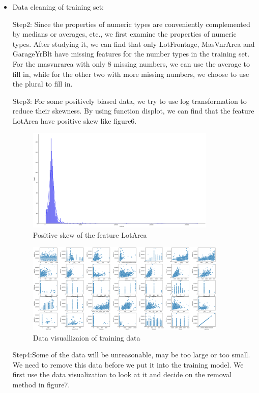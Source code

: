 \documentclass{amsart}
\begin{document}
\begin{itemize}
	\item Data cleaning of training set:\par
	Step2:	Since the properties of numeric types are conveniently complemented by medians or averages, etc., we first examine the properties of numeric types. After studying it, we can find that only LotFrontage, MasVnrArea and GarageYrBlt have missing features for the number types in the training set. For the masvnrarea with only 8 missing numbers, we can use the average to fill in, while for the other two with more missing numbers, we choose to use the plural to fill in.\par
	Step3:	For some positively biased data, we try to use log transformation to reduce their skewness. By using function displot, we can find that the feature LotArea have positive skew like figure6.\par
	\begin{figure}[H]
		\centering
		\includegraphics[width=0.85\textwidth]{../Data/Fig6}
		\caption{Positive skew of the feature LotArea}\label{object}
	\end{figure}
	\begin{figure}[H]
		\centering
		\includegraphics[width=0.9\textwidth]{../Data/Fig7}
		\caption{Data visuallizaion of training data}\label{object}
	\end{figure}
	Step4:Some of the data will be unreasonable, may be too large or too small. We need to remove this data before we put it into the training model. We first use the data visualization to look at it and decide on the removal method in figure7.\par

\end{itemize}
\end{document}
